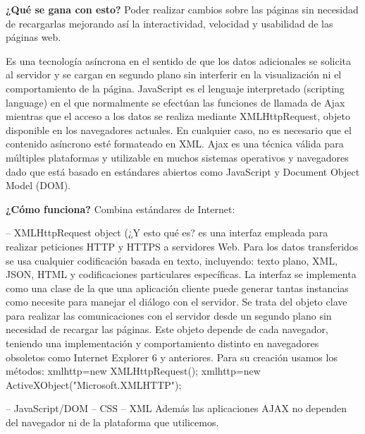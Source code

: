 \documentclass{apuntes}
\begin{document}
\textbf{¿Qué se gana con esto?}
Poder realizar cambios sobre las páginas sin necesidad de recargarlas mejorando así la interactividad, velocidad y usabilidad de las páginas web.

Es una tecnología asíncrona en el sentido de que los datos adicionales se solicita al servidor y se cargan en segundo plano sin interferir en la visualización ni el comportamiento de la página. JavaScript es el lenguaje interpretado (scripting language) en el que normalmente se efectúan las funciones de llamada de Ajax mientras que el acceso a los datos se realiza mediante XMLHttpRequest, objeto disponible en los navegadores actuales. En cualquier caso, no es necesario que el contenido asíncrono esté formateado en XML.
Ajax es una técnica válida para múltiples plataformas y utilizable en muchos sistemas operativos y navegadores dado que está basado en estándares abiertos como JavaScript y Document Object Model (DOM).

\textbf{¿Cómo funciona?}
Combina estándares de Internet:

– XMLHttpRequest object (¿Y esto qué es? es una interfaz empleada para realizar peticiones HTTP y HTTPS a servidores Web. Para los datos transferidos se usa cualquier codificación basada en texto, incluyendo: texto plano, XML, JSON, HTML y codificaciones particulares específicas. La interfaz se implementa como una clase de la que una aplicación cliente puede generar tantas instancias como necesite para manejar el diálogo con el servidor. Se trata del objeto clave para realizar las comunicaciones con el servidor desde un segundo plano  sin necesidad de recargar las páginas. Este objeto depende de cada navegador, teniendo una implementación y comportamiento distinto en navegadores obsoletos como Internet Explorer 6 y anteriores. Para su creación usamos los métodos: 
xmlhttp=new XMLHttpRequest();
xmlhttp=new ActiveXObject("Microsoft.XMLHTTP");

– JavaScript/DOM
– CSS
– XML
Además las aplicaciones AJAX no dependen del navegador ni de la plataforma que utilicemos.
\end{document}
